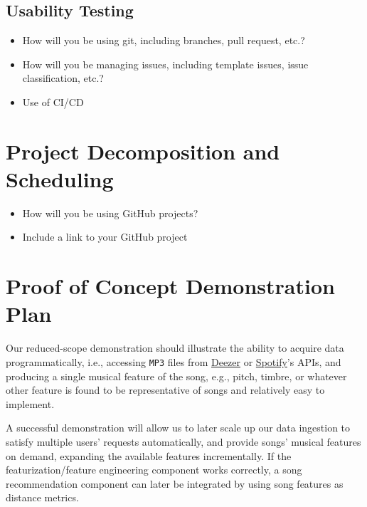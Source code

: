 \documentclass{article}
\begin{document}
\subsection{Usability Testing}
\begin{itemize}
	\item How will you be using git, including branches, pull request, etc.?
	\item How will you be managing issues, including template issues, issue
	classification, etc.?
  \item Use of CI/CD
\end{itemize}

\section{Project Decomposition and Scheduling}

\begin{itemize}
  \item How will you be using GitHub projects?
  \item Include a link to your GitHub project
\end{itemize}


\section{Proof of Concept Demonstration Plan}

\begin{description}[leftmargin=0cm]
  \item[Demonstration] Our reduced-scope demonstration should illustrate the ability to acquire data programmatically, i.e., accessing \texttt{MP3} files from \href{https://developers.deezer.com/api}{Deezer} or \href{https://developer.spotify.com/documentation/web-api}{Spotify}'s APIs, and producing a single musical feature of the song, e.g., pitch, timbre, or whatever other feature is found to be representative of songs and relatively easy to implement.
  \item[Post-demonstration] A successful demonstration will allow us to later scale up our data ingestion to satisfy multiple users' requests automatically, and provide songs' musical features on demand, expanding the available features incrementally. If the featurization/feature engineering component works correctly, a song recommendation component can later be integrated by using song features as distance metrics.
\end{description}
\end{document}
